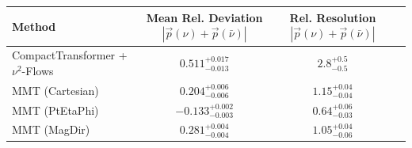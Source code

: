     \begin{tabular}{lccc}
        \toprule
        Method & Mean Rel. Deviation $|\vec{p}(\nu) + \vec{p}(\bar{\nu})|$ & Rel. Resolution $|\vec{p}(\nu) + \vec{p}(\bar{\nu})|$ \\
        \midrule
        CompactTransformer + $\nu^2$-Flows & $0.511^{+0.017}_{-0.013}$ & $2.8^{+0.5}_{-0.5}$ \\
        MMT (Cartesian) & $0.204^{+0.006}_{-0.006}$ & $1.15^{+0.04}_{-0.04}$ \\
        MMT (PtEtaPhi) & $-0.133^{+0.002}_{-0.003}$ & $0.64^{+0.06}_{-0.03}$ \\
        MMT (MagDir) & $0.281^{+0.004}_{-0.004}$ & $1.05^{+0.04}_{-0.06}$ \\
        \bottomrule
    \end{tabular}
